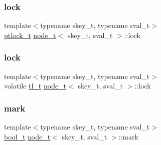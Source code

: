 \mbox{\label{structnode__t_a9efe5c548c28ff5d1cddfde25bac62be}} 
\subsubsection{\texorpdfstring{lock}{lock}\hspace{0.1cm}{\footnotesize\ttfamily [1/2]}}
{\footnotesize\ttfamily template$<$typename skey\+\_\+t, typename sval\+\_\+t$>$ \\
\hyperlink{ccavl__impl_8h_a61cf36cb33c84af9c784f95686701a94}{ptlock\+\_\+t} \hyperlink{structnode__t}{node\+\_\+t}$<$ skey\+\_\+t, sval\+\_\+t $>$\+::lock}

\mbox{\label{structnode__t_a7c381d5204a650a3db959fc75b644800}} 
\subsubsection{\texorpdfstring{lock}{lock}\hspace{0.1cm}{\footnotesize\ttfamily [2/2]}}
{\footnotesize\ttfamily template$<$typename skey\+\_\+t, typename sval\+\_\+t$>$ \\
volatile \hyperlink{ticket__impl_8h_aa989d88f1299dac19db854e7c54a1615}{tl\+\_\+t} \hyperlink{structnode__t}{node\+\_\+t}$<$ skey\+\_\+t, sval\+\_\+t $>$\+::lock}

\mbox{\label{structnode__t_a5977cf60c984f00d4aa29052ca0c3119}} 
\subsubsection{\texorpdfstring{mark}{mark}}
{\footnotesize\ttfamily template$<$typename skey\+\_\+t, typename sval\+\_\+t$>$ \\
\hyperlink{drachsler__impl_8h_a57c3b7201116536b822f0f8520aa99c7}{bool\+\_\+t} \hyperlink{structnode__t}{node\+\_\+t}$<$ skey\+\_\+t, sval\+\_\+t $>$\+::mark}

\mbox{\label{structnode__t_a7482a01833d41068cacfdc984ce63f84}} 
